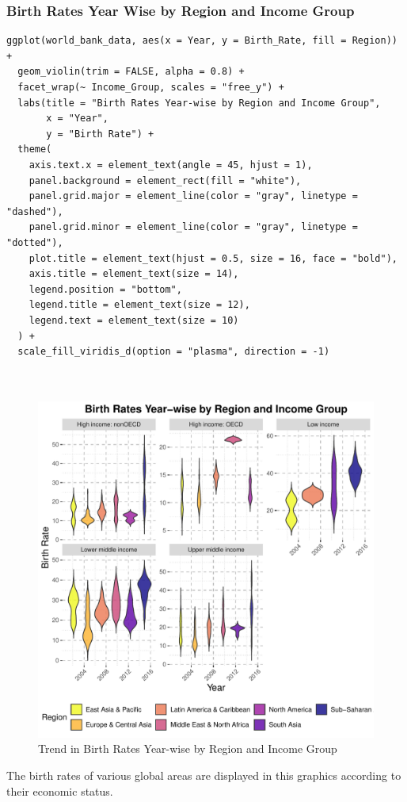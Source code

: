 \documentclass{article}\usepackage[]{graphicx}\usepackage[]{xcolor}
\makeatletter
\def\maxwidth{ %
  \ifdim\Gin@nat@width>\linewidth
    \linewidth
  \else
    \Gin@nat@width
  \fi
}
\newenvironment{knitrout}{}{} %
\makeatother
\begin{document}
\subsubsection{Birth Rates Year Wise by Region and Income Group}
\begin{lstlisting}
ggplot(world_bank_data, aes(x = Year, y = Birth_Rate, fill = Region)) +
  geom_violin(trim = FALSE, alpha = 0.8) +  
  facet_wrap(~ Income_Group, scales = "free_y") +  
  labs(title = "Birth Rates Year-wise by Region and Income Group",
       x = "Year",
       y = "Birth Rate") +
  theme(
    axis.text.x = element_text(angle = 45, hjust = 1),
    panel.background = element_rect(fill = "white"),
    panel.grid.major = element_line(color = "gray", linetype = "dashed"),
    panel.grid.minor = element_line(color = "gray", linetype = "dotted"),
    plot.title = element_text(hjust = 0.5, size = 16, face = "bold"),
    axis.title = element_text(size = 14),
    legend.position = "bottom",
    legend.title = element_text(size = 12),
    legend.text = element_text(size = 10)
  ) +
  scale_fill_viridis_d(option = "plasma", direction = -1) 



\end{lstlisting}
\newpage
\begin{figure}[h!]
\centering
\begin{knitrout}
\color{fgcolor}
\includegraphics[width=\maxwidth]{figure/unnamed-chunk-10-1} 
\end{knitrout}
\caption{Trend in Birth Rates Year-wise by Region and Income Group}
\label{fig}
\end{figure}
The birth rates of various global areas are displayed in this graphics according to their economic status.\hfill \break
\end{document}
